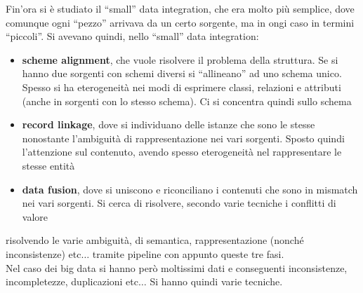 \documentclass[a4paper,12pt, oneside]{book}
\begin{document}
Fin'ora si è studiato il ``small'' data integration, che era molto più semplice,
dove comunque ogni ``pezzo'' arrivava da un certo sorgente, ma in ongi caso in
termini ``piccoli''. Si avevano quindi, nello ``small'' data integration:
\begin{itemize}
  \item \textbf{scheme alignment}, che vuole risolvere il problema della
  struttura. Se si hanno due sorgenti con schemi diversi si ``allineano'' ad uno
  schema unico. Spesso si ha eterogeneità nei modi di esprimere classi,
  relazioni e attributi (anche in sorgenti con lo stesso schema). Ci si
  concentra quindi sullo schema
  \item \textbf{record linkage}, dove si individuano delle istanze che sono le
  stesse nonostante l'ambiguità di rappresentazione nei vari sorgenti. Sposto
  quindi l'attenzione sul contenuto, avendo spesso eterogeneità nel
  rappresentare le stesse entità
  \item \textbf{data fusion}, dove si uniscono e riconciliano i contenuti che
  sono in mismatch nei vari sorgenti. Si cerca di risolvere, secondo varie
  tecniche i conflitti di valore
\end{itemize}
risolvendo le varie ambiguità, di semantica, rappresentazione (nonché
inconsistenze) etc$\ldots$ tramite pipeline con appunto queste tre fasi.\\
Nel caso dei big data si hanno però moltissimi dati e conseguenti inconsistenze,
incompletezze, duplicazioni etc$\ldots$ Si hanno quindi varie tecniche.
\end{document}
